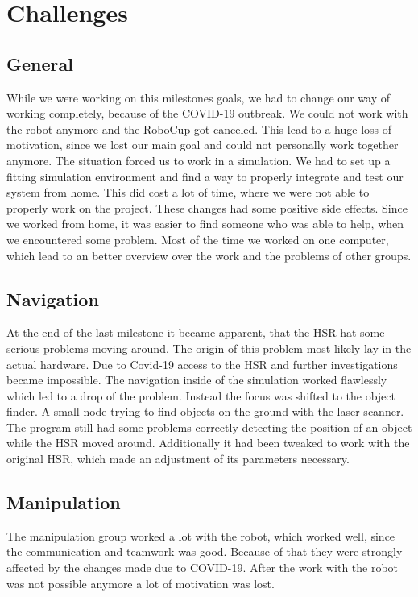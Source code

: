 \documentclass[main.tex]{subfiles}
\begin{document}
	
	\chapter{Challenges}

\section{General}

While we were working on this milestones goals, we had to change our way of working completely, because of the COVID-19 outbreak.
We could not work with the robot anymore and the RoboCup got canceled. This lead to a huge loss of motivation, since we lost our main goal and could not personally work together anymore.
The situation forced us to work in a simulation. We had to set up a fitting simulation environment and find a way to properly integrate and test our system from home. This did cost a lot of time, where we were not able to properly work on the project.
These changes had some positive side effects. Since we worked from home, it was easier to find someone who was able to help, when we encountered some problem. Most of the time we worked on one computer, which lead to an better overview over the work and the problems of other groups.

\section{Navigation}
At the end of the last milestone it became apparent, that the HSR hat some serious problems moving around. The origin of this problem most likely lay in the actual hardware. Due to Covid-19 access to the HSR and further investigations became impossible. The navigation inside of the simulation worked flawlessly which led to a drop of the problem. Instead the focus was shifted to the object finder. A small node trying to find objects on the ground with the laser scanner. The program still had some problems correctly detecting the position of an object while the HSR moved around. Additionally it had been tweaked to work with the original HSR, which made an adjustment of its parameters necessary.  

\section{Manipulation}

The manipulation group worked a lot with the robot, which worked well, since the communication and teamwork was good.
Because of that they were strongly affected by the changes made due to COVID-19. After the work with the robot was not possible anymore a lot of motivation was lost.
\end{document}
